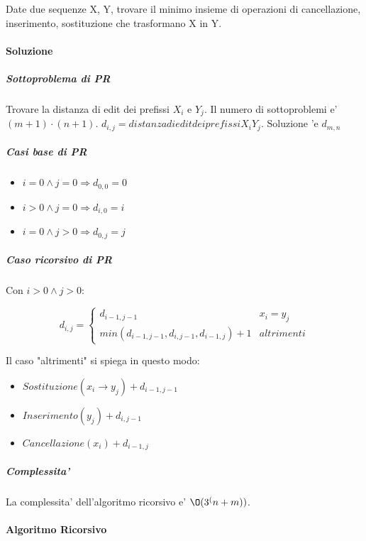 Date due sequenze X, Y, trovare il minimo insieme di operazioni di cancellazione, inserimento, sostituzione che trasformano X in Y.

\paragraph{Soluzione}

\subparagraph{Sottoproblema di PR}

Trovare la distanza di edit dei prefissi $X_i$ e $Y_j$.
Il numero di sottoproblemi e' $(m+1) \cdot (n+1)$.
$d_{i,j} = distanza di edit dei prefissi X_i Y_j$.
Soluzione 'e $d_{m, n}$

\subparagraph{Casi base di PR}

\begin{itemize}
    \item $i = 0 \land j = 0 \Rightarrow d_{0,0} = 0$
    \item $i > 0 \land j = 0 \Rightarrow d_{i,0} = i$
    \item $i = 0 \land j > 0 \Rightarrow d_{0,j} = j$
\end{itemize}

\subparagraph{Caso ricorsivo di PR}

Con $i > 0 \land j > 0$:

\[
    \text{$d_{i,j}$} =
    \begin{cases}
      \text{$d_{i-1, j-1}$} & \text{$x_i = y_j$} \\
      \text{$min(d_{i-1, j-1}, d_{i, j-1}, d_{i-1, j}) + 1$} & altrimenti
    \end{cases}
\]

Il caso "altrimenti" si spiega in questo modo:
\begin{itemize}
    \item $Sostituzione(x_i \rightarrow y_j) + d_{i-1, j-1}$
    \item $Inserimento(y_j) + d_{i,j-1}$
    \item $Cancellazione(x_i) + d_{i-1, j}$
\end{itemize}

\subparagraph{Complessita'}

La complessita' dell'algoritmo ricorsivo e' $\O(3^(n+m))$.

\paragraph{Algoritmo Ricorsivo}

